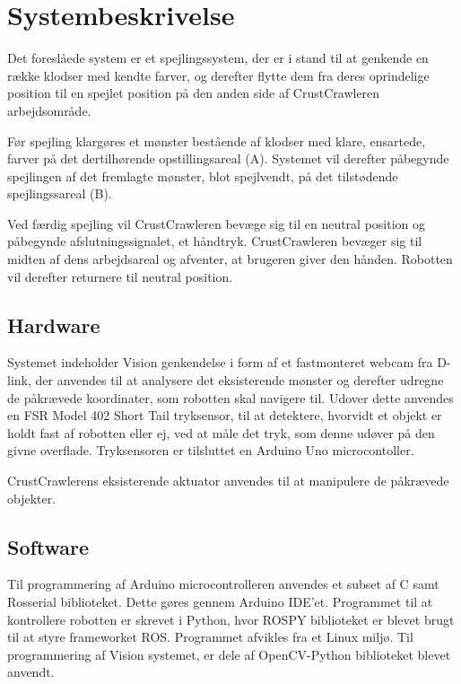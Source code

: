 \chapter{Systembeskrivelse}\label{chap:Systembeskrivelse}
Det foreslåede system er et spejlingssystem, der er i stand til at genkende en række klodser med kendte farver, og derefter flytte dem fra deres oprindelige position til en spejlet position på den anden side af CrustCrawleren arbejdsområde. 

Før spejling klargøres et mønster bestående af klodser med klare, ensartede, farver på det dertilhørende opstillingsareal (A).
Systemet vil derefter påbegynde spejlingen af det fremlagte mønster, blot spejlvendt, på det tilstødende spejlingssareal (B).

Ved færdig spejling vil CrustCrawleren bevæge sig til en neutral position og påbegynde afslutningssignalet, et håndtryk.
CrustCrawleren bevæger sig til midten af dens arbejdsareal og afventer, at brugeren giver den hånden.
Robotten vil derefter returnere til neutral position.
\newpage

\section{Hardware}\label{sec:Hardware}
Systemet indeholder Vision genkendelse i form af et fastmonteret webcam fra D-link, der anvendes til at analysere det eksisterende mønster og derefter udregne de påkrævede koordinater, som robotten skal navigere til. 
Udover dette anvendes en FSR\textsuperscript{\textregistered} Model 402 Short Tail tryksensor, til at detektere, hvorvidt et objekt er holdt fast af robotten eller ej, ved at måle det tryk, som denne udøver på den givne overflade.
Tryksensoren er tilsluttet en Arduino Uno microcontoller.

CrustCrawlerens eksisterende aktuator anvendes til at manipulere de påkrævede objekter.

\section{Software}\label{sec:Software}
Til programmering af Arduino microcontrolleren anvendes et subset af C samt Rosserial biblioteket.
Dette gøres gennem Arduino IDE'et.
Programmet til at kontrollere robotten er skrevet i Python, hvor ROSPY biblioteket er blevet brugt til at styre frameworket ROS.
Programmet afvikles fra et Linux miljø.
Til programmering af Vision systemet, er dele af OpenCV-Python biblioteket blevet anvendt. 